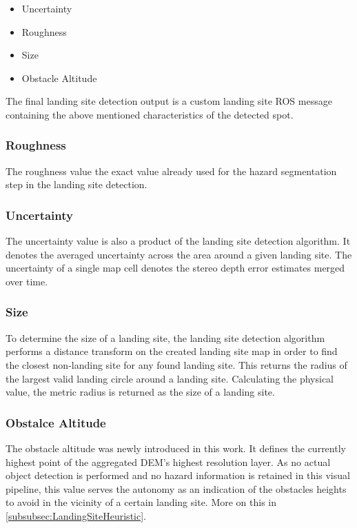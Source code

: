 \begin{itemize}
    \item Uncertainty
    \item Roughness
    \item Size
    \item Obstacle Altitude
\end{itemize}
The final landing site detection output is a custom landing site ROS message containing the above mentioned characteristics of the detected spot.

\subsubsection{Roughness}

The roughness value the exact value already used for the hazard segmentation step in the landing site detection. 

\subsubsection{Uncertainty}

The uncertainty value is also a product of the landing site detection algorithm. It denotes the averaged uncertainty across the area around a given landing site. The uncertainty of a single map cell denotes the stereo depth error estimates merged over time.

\subsubsection{Size}

To determine the size of a landing site, the landing site detection algorithm performs a distance transform on the created landing site map in order to find the closest non-landing site for any found landing site. This returns the radius of the largest valid landing circle around a landing site. Calculating the physical value, the metric radius is returned as the size of a landing site.

\subsubsection{Obstalce Altitude}\label{subsec:obstacle_altitude}

The obstacle altitude was newly introduced in this work. It defines the currently highest point of the aggregated DEM's highest resolution layer. As no actual object detection is performed and no hazard information is retained in this visual pipeline, this value serves the autonomy as an indication of the obstacles heights to avoid in the vicinity of a certain landing site. More on this in \cref{subsubsec:LandingSiteHeuristic}.




